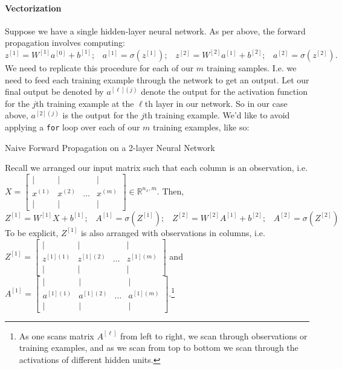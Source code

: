 \documentclass[12pt]{article}
\begin{document}
\paragraph{Vectorization} Suppose we have a single hidden-layer neural network. As per above, the forward propagation involves computing: 
$  z^{[1]} = W^{[1]}a^{[0]} + b^{[1]}; \hspace{10pt} a^{[1]} = \sigma(z^{[1]}); \hspace{10pt} 
   z^{[2]} = W^{[2]}a^{[1]} + b^{[2]}; \hspace{10pt} 
   a^{[2]} = \sigma(z^{[2]}).
$
We need to replicate this procedure for each of our $m$ training samples. I.e. we need to feed each training example through the network to get an output. Let our final output be denoted by $a^{[\ell](j)}$ denote the output for the activation function for the $j$th training example at the $\ell$th layer in our network. So in our case above, $a^{[2](j)}$ is the output for the $j$th training example.
We'd like to avoid applying a \texttt{for} loop over each of our $m$ training examples, like so:
{\footnotesize
\begin{algorithm}[h]
  \caption{Naive Forward Propagation on a 2-layer Neural Network}    \end{algorithm}
}
\newline
\vspace{-.5ex}Recall we arranged our input matrix such that each column is an observation, i.e. $X = \begin{bmatrix}    | & | & & | \\    x^{(1)} & x^{(2)} & \ldots & x^{(m)} \\   | & | & & |  \end{bmatrix} \in \mathbb R^{n_x, m}$. Then,
$  
  Z^{[1]} = W^{[1]} X + b^{[1]}; \hspace{10pt}
  A^{[1]} = \sigma(Z^{[1]}); \hspace{10pt}
  Z^{[2]} = W^{[2]} A^{[1]} + b^{[2]}; \hspace{10pt}
  A^{[2]} = \sigma(Z^{[2]})
$ To be explicit, $Z^{[1]}$ is also arranged with observations in columns, i.e. $Z^{[1]} = \begin{bmatrix}   | & | & & | \\ z^{[1](1)} & z^{[1](2)} & \ldots & z^{[1](m)} \\ | & | & & | \end{bmatrix}$ and $A^{[1]} = \begin{bmatrix}    | & | & & | \\    a^{[1](1)} & a^{[1](2)} & \ldots & a^{[1](m)}  \\  | & | & & | \end{bmatrix}$.\footnote{As one scans matrix $A^{[\ell]}$ from left to right, we scan through observations or training examples, and as we scan from top to bottom we scan through the activations of different hidden units.}
\end{document}
